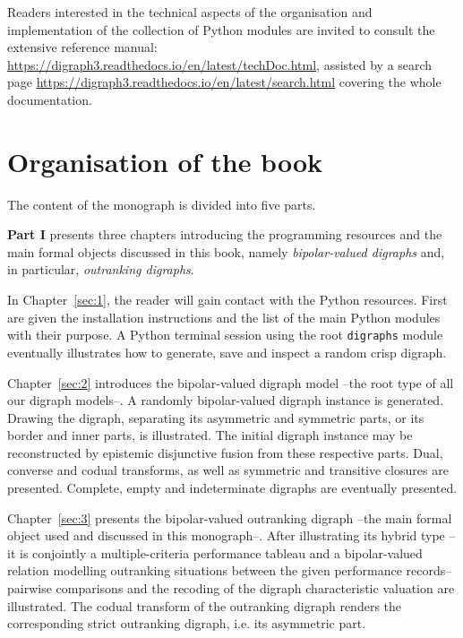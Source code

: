 Readers interested in the technical aspects of the organisation and implementation of the collection of \Digraph Python modules are invited to consult the extensive reference manual: \href{https://digraph3.readthedocs.io/en/latest/techDoc.html}{https://digraph3.readthedocs.io/en/latest/techDoc.html}, assisted by a search page \href{https://digraph3.readthedocs.io/en/latest/search.html}{https://digraph3.readthedocs.io/en/latest/search.html} covering the whole \Digraph documentation. 

{}
\section*{Organisation of the book}
\label{sec:0.2}

The content of the monograph is divided into five parts.

\vspace{5pt}

\textbf{Part I} presents three chapters introducing the \Digraph programming resources and the main formal objects discussed in this book, namely \emph{bipolar-valued digraphs} and, in particular, \emph{outranking digraphs}.

In Chapter~\ref{sec:1}, the reader will gain contact with the \Digraph Python resources. First are given the installation instructions and the list of the main \Digraph Python modules with their purpose. A Python terminal session using the root \texttt{digraphs} module eventually illustrates how to generate, save and inspect a random crisp digraph.

Chapter~\ref{sec:2} introduces the bipolar-valued digraph model --the root type of all our digraph models--. A randomly bipolar-valued digraph instance is generated. Drawing the digraph, separating its asymmetric and symmetric parts, or its border and inner parts, is illustrated. The initial digraph instance may be reconstructed by epistemic disjunctive fusion from these respective parts. Dual, converse and codual transforms, as well as symmetric and transitive closures are presented. Complete, empty and indeterminate digraphs are eventually presented.

Chapter~\ref{sec:3} presents the bipolar-valued outranking digraph --the main formal object used and discussed in this monograph--. After illustrating its hybrid type --it is conjointly a multiple-criteria performance tableau and a bipolar-valued relation modelling outranking situations between the given performance records-- pairwise comparisons and the recoding of the digraph characteristic valuation are illustrated. The codual transform of the outranking digraph renders the corresponding strict outranking digraph, i.e. its asymmetric part. 
\vspace{5pt}

